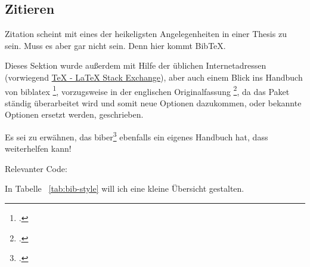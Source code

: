 \subsection{Zitieren}
Zitation scheint mit eines der heikeligsten Angelegenheiten in einer Thesis zu sein. Muss es aber gar nicht sein. Denn hier kommt Bib\TeX{}.

Dieses Sektion wurde außerdem mit Hilfe der üblichen Internetadressen (vorwiegend \href{https://tex.stackexchange.com/}{TeX - LaTeX Stack Exchange}), aber auch einem Blick ins Handbuch von biblatex \footcite{lehman_biblatex_2017}, vorzugsweise in der englischen Originalfassung \footcite{kime_biblatex_2019}, da das Paket ständig überarbeitet wird und somit neue Optionen dazukommen, oder bekannte Optionen ersetzt werden, geschrieben.

Es sei zu erwähnen, das biber\footcite[][]{philip_kime_biber_2019} ebenfalls ein eigenes Handbuch hat, dass weiterhelfen kann!

Relevanter Code:


In Tabelle ~\ref{tab:bib-style} will ich eine kleine Übersicht gestalten.

